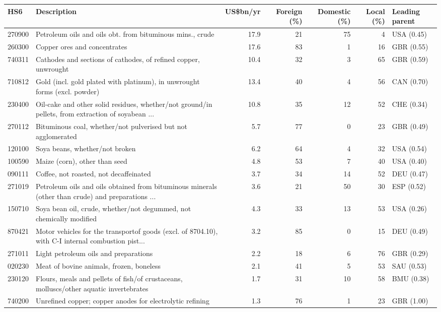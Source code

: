 \begin{tabular}{@{}l p{6.4cm} r r r r l@{}}
\toprule
HS6 & Description & US\$bn/yr & Foreign (\%) & Domestic (\%) & Local (\%) & Leading parent \\
\midrule
270900 & Petroleum oils and oils obt. from bituminous mins., crude & 17.9 & 21 & 75 & 4 & USA (0.45) \\
260300 & Copper ores and concentrates & 17.6 & 83 & 1 & 16 & GBR (0.55) \\
740311 & Cathodes and sections of cathodes, of refined copper, unwrought & 10.4 & 32 & 3 & 65 & GBR (0.59) \\
710812 & Gold (incl. gold plated with platinum), in unwrought forms (excl. powder) & 13.4 & 40 & 4 & 56 & CAN (0.70) \\
230400 & Oil-cake and other solid residues, whether/\allowbreak{}not ground/\allowbreak{}in pellets, from extraction of soyabean ... & 10.8 & 35 & 12 & 52 & CHE (0.34) \\
270112 & Bituminous coal, whether/\allowbreak{}not pulverised but not agglomerated & 5.7 & 77 & 0 & 23 & GBR (0.49) \\
120100 & Soya beans, whether/\allowbreak{}not broken & 6.2 & 64 & 4 & 32 & USA (0.54) \\
100590 & Maize (corn), other than seed & 4.8 & 53 & 7 & 40 & USA (0.40) \\
090111 & Coffee, not roasted, not decaffeinated & 3.7 & 34 & 14 & 52 & DEU (0.47) \\
271019 & Petroleum oils and oils obtained from bituminous minerals (other than crude) and preparations ... & 3.6 & 21 & 50 & 30 & ESP (0.52) \\
150710 & Soya bean oil, crude, whether/\allowbreak{}not degummed, not chemically modified & 4.3 & 33 & 13 & 53 & USA (0.26) \\
870421 & Motor vehicles for the transportof goods (excl. of 8704.10), with C-I internal combustion pist... & 3.2 & 85 & 0 & 15 & DEU (0.49) \\
271011 & Light petroleum oils and preparations & 2.2 & 18 & 6 & 76 & GBR (0.29) \\
020230 & Meat of bovine animals, frozen, boneless & 2.1 & 41 & 5 & 53 & SAU (0.53) \\
230120 & Flours, meals and pellets of fish/\allowbreak{}of crustaceans, molluscs/\allowbreak{}other aquatic invertebrates & 1.7 & 31 & 10 & 58 & BMU (0.38) \\
740200 & Unrefined copper; copper anodes for electrolytic refining & 1.3 & 76 & 1 & 23 & GBR (1.00) \\

\end{tabular}
